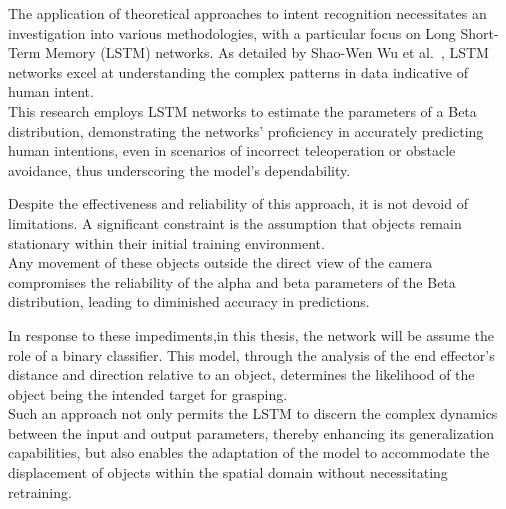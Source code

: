  The application of theoretical approaches to intent recognition necessitates an investigation into various methodologies, with a particular focus on Long Short-Term Memory (LSTM) networks. 
 As detailed by Shao-Wen Wu et al.~\cite{wu2019predicting}, LSTM networks excel at understanding the complex patterns in data indicative of human intent. \\
 This research employs LSTM networks to estimate the parameters of a Beta distribution, demonstrating the networks' proficiency in accurately predicting human intentions, even in scenarios of incorrect teleoperation or obstacle avoidance, thus underscoring the model's dependability.

 Despite the effectiveness and reliability of this approach, it is not devoid of limitations. 
 A significant constraint is the assumption that objects remain stationary within their initial training environment. \\
 Any movement of these objects outside the direct view of the camera compromises the reliability of the alpha and beta parameters of the Beta distribution, leading to diminished accuracy in predictions.
 
In response to these impediments,in this thesis, the network will be assume the role of a binary classifier. 
This model, through the analysis of the end effector's distance and direction relative to an object, determines the likelihood of the object being the intended target for grasping. \\
Such an approach not only permits the LSTM to discern the complex dynamics between the input and output parameters, thereby enhancing its generalization capabilities, but also enables the adaptation of the model to accommodate the displacement of objects within the spatial domain without necessitating retraining.

